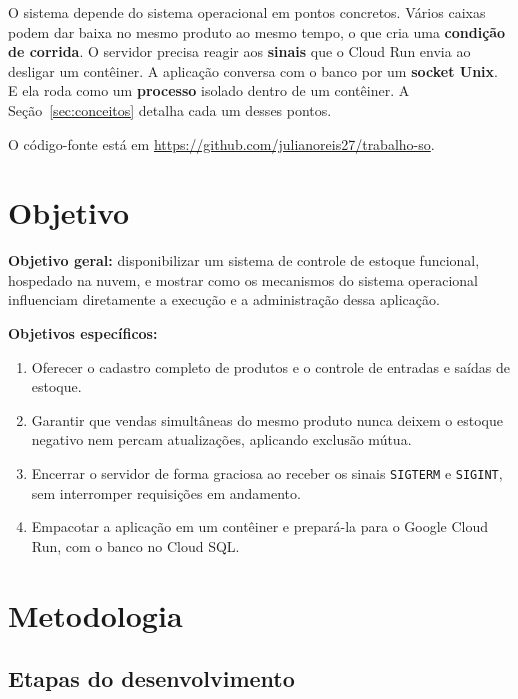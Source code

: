 \documentclass[12pt,a4paper]{article}
\newcommand{\repositorio}{https://github.com/julianoreis27/trabalho-so}
\begin{document}
O sistema depende do sistema operacional em pontos concretos. Vários caixas podem dar baixa
no mesmo produto ao mesmo tempo, o que cria uma \textbf{condição de corrida}. O servidor
precisa reagir aos \textbf{sinais} que o Cloud Run envia ao desligar um contêiner. A
aplicação conversa com o banco por um \textbf{socket Unix}. E ela roda como um
\textbf{processo} isolado dentro de um contêiner. A Seção~\ref{sec:conceitos} detalha cada um
desses pontos.

O código-fonte está em \url{\repositorio}.

\section{Objetivo}

\textbf{Objetivo geral:} disponibilizar um sistema de controle de estoque funcional,
hospedado na nuvem, e mostrar como os mecanismos do sistema operacional influenciam
diretamente a execução e a administração dessa aplicação.

\textbf{Objetivos específicos:}
\begin{enumerate}
  \item Oferecer o cadastro completo de produtos e o controle de entradas e saídas de estoque.
  \item Garantir que vendas simultâneas do mesmo produto nunca deixem o estoque negativo nem
        percam atualizações, aplicando exclusão mútua.
  \item Encerrar o servidor de forma graciosa ao receber os sinais \texttt{SIGTERM} e
        \texttt{SIGINT}, sem interromper requisições em andamento.
  \item Empacotar a aplicação em um contêiner e prepará-la para o Google Cloud Run, com
        o banco no Cloud SQL.
\end{enumerate}

\section{Metodologia}

\subsection{Etapas do desenvolvimento}
\end{document}
